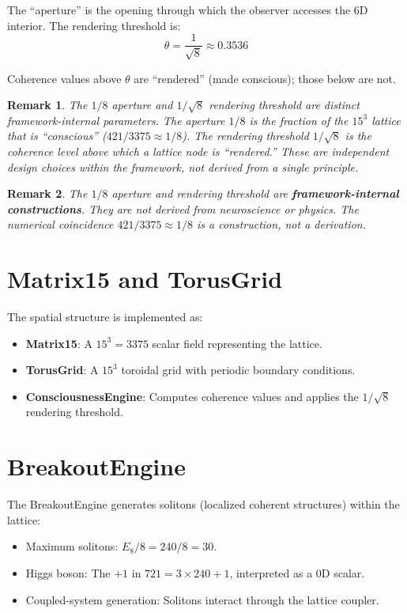 \documentclass[11pt]{article}
\newtheorem{remark}{Remark}
\begin{document}
The ``aperture'' is the opening through which the observer accesses the 6D interior. The rendering threshold is:
\begin{equation}
\theta = \frac{1}{\sqrt{8}} \approx 0.3536
\end{equation}

Coherence values above $\theta$ are ``rendered'' (made conscious); those below are not.

\begin{remark}
The $1/8$ aperture and $1/\sqrt{8}$ rendering threshold are distinct framework-internal parameters. The aperture $1/8$ is the fraction of the $15^3$ lattice that is ``conscious'' ($421/3375 \approx 1/8$). The rendering threshold $1/\sqrt{8}$ is the coherence level above which a lattice node is ``rendered.'' These are independent design choices within the framework, not derived from a single principle.
\end{remark}

\begin{remark}
The $1/8$ aperture and rendering threshold are \textbf{framework-internal constructions}. They are not derived from neuroscience or physics. The numerical coincidence $421/3375 \approx 1/8$ is a construction, not a derivation.
\end{remark}

\section{Matrix15 and TorusGrid}

The spatial structure is implemented as:

\begin{itemize}
\item \textbf{Matrix15}: A $15^3 = 3375$ scalar field representing the lattice.
\item \textbf{TorusGrid}: A $15^3$ toroidal grid with periodic boundary conditions.
\item \textbf{ConsciousnessEngine}: Computes coherence values and applies the $1/\sqrt{8}$ rendering threshold.
\end{itemize}

\section{BreakoutEngine}

The BreakoutEngine generates solitons (localized coherent structures) within the lattice:

\begin{itemize}
\item Maximum solitons: $E_8/8 = 240/8 = 30$.
\item Higgs boson: The $+1$ in $721 = 3 \times 240 + 1$, interpreted as a 0D scalar.
\item Coupled-system generation: Solitons interact through the lattice coupler.
\end{itemize}
\end{document}
